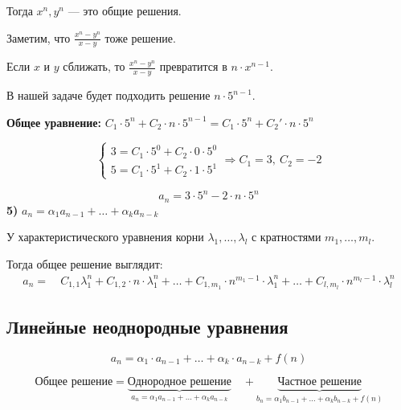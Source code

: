 \documentclass[10pt, a4paper]{article}
\begin{document}
\noindent Тогда $x^n, y^n$ — это общие решения.

\vspace{0.5em}
\noindent Заметим, что $\frac{x^n - y^n}{x - y}$ тоже решение.

\vspace{0.5em}
\noindent Если $x$ и $y$ сближать, то $\frac{x^n - y^n}{x - y}$ превратится в $n \cdot x^{n-1}$.

\vspace{0.5em}
\noindent В нашей задаче будет подходить решение $n \cdot 5^{n-1}$.

\vspace{1em}
\noindent \textbf{Общее уравнение:} $C_1 \cdot 5^n + C_2 \cdot n \cdot 5^{n-1} = C_1 \cdot 5^n + C_2' \cdot n \cdot 5^n$

\vspace{1em}
$$
\begin{cases}
    3 = C_1 \cdot 5^0 + C_2 \cdot 0 \cdot 5^0 \\
    5 = C_1 \cdot 5^1 + C_2 \cdot 1 \cdot 5^1 
\end{cases} \Rightarrow C_1 = 3, \ C_2 = -2
$$

\vspace{1em}
$$ a_n = 3 \cdot 5^n - 2 \cdot n \cdot 5^n $$
\noindent \textbf{5)} $a_n = \alpha_1 a_{n-1} + \dots + \alpha_k a_{n-k}$

\vspace{0.5em}
\noindent У характеристического уравнения корни $\lambda_1, \dots, \lambda_l$ с кратностями $m_1, \dots, m_l$.

\vspace{0.5em}
\noindent Тогда общее решение выглядит:
\begin{align*}
    a_n = \ &C_{1,1} \lambda_1^n + C_{1,2} \cdot n \cdot \lambda_1^n + \dots + C_{1,m_1} \cdot n^{m_1-1} \cdot \lambda_1^n + \dots + C_{l,m_l} \cdot n^{m_l-1} \cdot \lambda_l^n
\end{align*}

\subsection*{Линейные неоднородные уравнения}
\[
a_n = \alpha_1 \cdot a_{n-1} + \dots + \alpha_k \cdot a_{n-k} + f(n)
\]

\[
\text{Общее решение} = \underbrace{\text{Однородное решение}}_{a_n = \alpha_1 a_{n-1} + \dots + \alpha_k a_{n-k}} \quad + \underbrace{\text{Частное решение}}_{b_n = \alpha_1 b_{n-1} + \dots + \alpha_k b_{n-k} + f(n)}
\]
\end{document}
